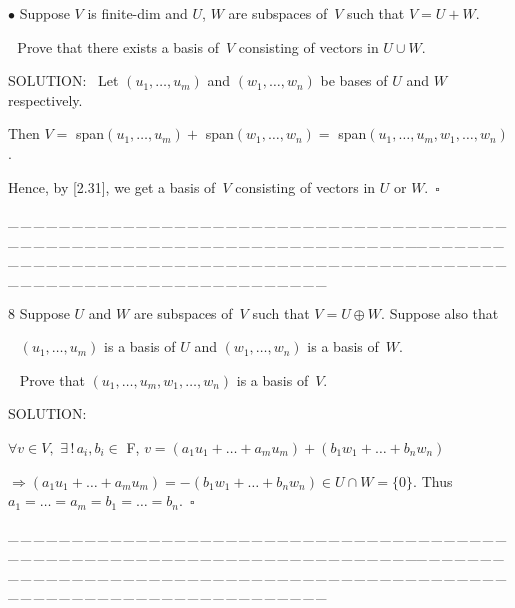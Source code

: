 \documentclass[a4paper, 11pt, UTF8]{article}
\begin{document}
\begin{large}
{\small $\bullet$} {\timessl\Large 
Suppose $V$ is finite-dim and $U$, $W$ are subspaces of \,$V$ such that $V=U+W$.}\par\,\,
{\timessl\Large Prove that there exists a basis of \,$V$ consisting of vectors in $U\cup W$.}\par
{\timesbf S\footnotesize{OLUTION:}}\,\,\,
Let $(u_1,\dots,u_m)$ and $(w_1,\dots,w_n)$ be bases of $U$ and $W$ respectively.\par\quad
Then $V=$ span$(u_1,\dots,u_m)+$ span$(w_1,\dots,w_n)=$ span$(u_1,\dots,u_m,w_1,\dots,w_n)$.\par\quad
Hence, by [2.31], we get a basis of \,$V$ consisting of vectors in $U$ or $W$.$\,\,\,\square$\par
{\tiny \_\,\_\,\_\,\_\,\_\,\_\,\_\,\_\,\_\,\_\,\_\,\_\,\_\,\_\,\_\,\_\,\_\,\_\,\_\,\_\,\_\,\_\,\_\,\_\,\_\,\_\,\_\,\_\,\_\,\_\,\_\,\_\,\_\,\_\,\_\,\_\,\_\,\_\,\_\,\_\,\_\,\_\,\_\,\_\,\_\,\_\,\_\,\_\,\_\,\_\,\_\,\_\,\_\,\_\,\_\,\_\,\_\,\_\,\_\,\_\,\_\,\_\,\_\,\_\,\_\,\_\,\_\,\_\,\_\,\_\,\_\_\,\_\,\_\,\_\,\_\,\_\,\_\,\_\,\_\,\_\,\_\,\_\,\_\,\_\,\_\,\_\,\_\,\_\,\_\,\_\,\_\,\_\,\_\,\_\,\_\,\_\,\_\,\_\,\_\,\_\,\_\,\_\,\_\,\_\,\_\,\_\,\_\,\_\,\_\,\_\,\_\,\_\,\_\,\_\,\_\,\_\,\_\,\_\,\_\,\_\,\_\,\_\,\_\,\_\,\_\,\_\,\_\,\_\,\_\,\_\,\_\,\_\,\_\,\_\,\_\,\_\,\_\,\_\,\_\,\_\,\_}\par

{\timesbf\Large 8} {\timessl\Large 
Suppose $U$ and $W$ are subspaces of \,$V$ such that $V=U\oplus W$. Suppose also that}\par\,\,\,
{\timessl\Large $(u_1,\dots,u_m)$ is a basis of $U$ and $(w_1,\dots,w_n)$ is a basis of \,$W$.}\par\,\,\,
{\timessl\Large Prove that $(u_1,\dots,u_m,w_1,\dots,w_n)$ is a basis of \,$V$.}\par
{\timesbf S\footnotesize{OLUTION:}}\par\quad
$\forall v\in V,\,\,\exists\,!\,a_i,b_i\in$ {\timesbf F}, $v=(a_1 u_1+\dots+a_m u_m)+(b_1 w_1+\dots+b_n w_n)$\par\quad
$\Rightarrow (a_1 u_1+\dots+a_m u_m)=-(b_1 w_1+\dots+b_n w_n)\in U\cap W=\{0\}$. Thus $a_1=\dots=a_m=b_1=\dots=b_n.\,\,\,\square$\par
{\tiny \_\,\_\,\_\,\_\,\_\,\_\,\_\,\_\,\_\,\_\,\_\,\_\,\_\,\_\,\_\,\_\,\_\,\_\,\_\,\_\,\_\,\_\,\_\,\_\,\_\,\_\,\_\,\_\,\_\,\_\,\_\,\_\,\_\,\_\,\_\,\_\,\_\,\_\,\_\,\_\,\_\,\_\,\_\,\_\,\_\,\_\,\_\,\_\,\_\,\_\,\_\,\_\,\_\,\_\,\_\,\_\,\_\,\_\,\_\,\_\,\_\,\_\,\_\,\_\,\_\,\_\,\_\,\_\,\_\,\_\,\_\_\,\_\,\_\,\_\,\_\,\_\,\_\,\_\,\_\,\_\,\_\,\_\,\_\,\_\,\_\,\_\,\_\,\_\,\_\,\_\,\_\,\_\,\_\,\_\,\_\,\_\,\_\,\_\,\_\,\_\,\_\,\_\,\_\,\_\,\_\,\_\,\_\,\_\,\_\,\_\,\_\,\_\,\_\,\_\,\_\,\_\,\_\,\_\,\_\,\_\,\_\,\_\,\_\,\_\,\_\,\_\,\_\,\_\,\_\,\_\,\_\,\_\,\_\,\_\,\_\,\_\,\_\,\_\,\_\,\_\,\_}{\tiny\,\par}


\end{large}
\end{document}
